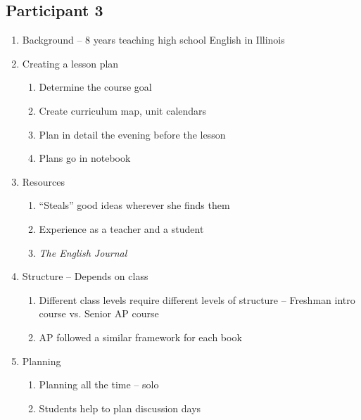 \subsection{Participant 3}
\begin{enumerate}
	\item Background -- 8 years teaching high school English in Illinois

	\item Creating a lesson plan
		\begin{enumerate}
			\item Determine the course goal

			\item Create curriculum map, unit calendars

			\item Plan in detail the evening before the lesson

			\item Plans go in notebook

		\end{enumerate}

	\item Resources
		\begin{enumerate}
			\item ``Steals'' good ideas wherever she finds them

			\item Experience as a teacher and a student

			\item \textit{The English Journal}

		\end{enumerate}

	\item Structure -- Depends on class
		\begin{enumerate}
			\item Different class levels require different levels of structure
				-- Freshman intro course vs. Senior AP course

			\item AP followed a similar framework for each book

		\end{enumerate}

	\item Planning
		\begin{enumerate}
			\item Planning all the time -- solo

			\item Students help to plan discussion days


\end{enumerate}
\end{enumerate}
